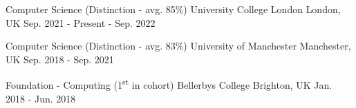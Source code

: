 

\begin{cventries}

  \eduentry
    {Computer Science (Distinction - avg. 85\%)} %
    {University College London} %
    {London, UK} %
    {Sep. 2021 - Present - Sep. 2022} %
    {
    }
    
  \eduentry
    {Computer Science (Distinction - avg. 83\%)} %
    {University of Manchester} %
    {Manchester, UK} %
    {Sep. 2018 - Sep. 2021} %
    {
    }
    
  \eduentry
    {Foundation - Computing (1\textsuperscript{st} in cohort)} %
    {Bellerbys College} %
    {Brighton, UK} %
    {Jan. 2018 - Jun. 2018} %
    {
    }
    

\end{cventries}
